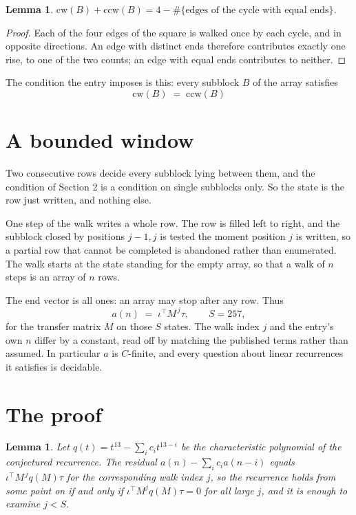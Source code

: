 \documentclass[11pt,a4paper]{article}
\theoremstyle{plain}
\newtheorem{lemma}[theorem]{Lemma}
\theoremstyle{definition}
\begin{document}
\begin{lemma}\label{lem:sum}
$\mathrm{cw}(B)+\mathrm{ccw}(B)=4-\#\{\text{edges of the cycle with equal ends}\}$.
\end{lemma}

\begin{proof}
Each of the four edges of the square is walked once by each cycle, and in opposite directions.
An edge with distinct ends therefore contributes exactly one rise, to one of the two counts;
an edge with equal ends contributes to neither.
\end{proof}

The condition the entry imposes is this: every subblock $B$ of the array satisfies
\[
\mathrm{cw}(B)\;=\;\mathrm{ccw}(B)
\]


\section{A bounded window}

Two consecutive rows decide every subblock lying between them, and the condition of Section 2 is a condition on single subblocks only. So the state is the row just written, and nothing else.

One step of the walk writes a whole row. The row is filled left to right, and the subblock
closed by positions $j-1,j$ is tested the moment position $j$ is written, so a partial row that
cannot be completed is abandoned rather than enumerated. The walk starts at the state standing
for the empty array, so that a walk of $n$ steps is an array of $n$ rows.

The end vector is all ones: an array may stop after any row. Thus
\[
a(n)\;=\;\iota^{\!\top}M^{\,j}\tau ,\qquad S=257,
\]
for the transfer matrix $M$ on those $S$ states. The walk index $j$ and the entry's own $n$
differ by a constant, read off by matching the published terms rather than assumed. In
particular $a$ is $C$-finite, and every question about linear recurrences it satisfies is
decidable.

\section{The proof}

\begin{lemma}\label{lem:crit}
Let $q(t)=t^{13}-\sum_i c_it^{13-i}$ be the characteristic polynomial of the
conjectured recurrence. The residual $a(n)-\sum_ic_ia(n-i)$ equals
$\iota^{\!\top}M^{\,j}q(M)\tau$ for the corresponding walk index $j$, so the recurrence
holds from some point on if and only if $\iota^{\!\top}M^{j}q(M)\tau=0$ for all large $j$,
and it is enough to examine $j<S$.
\end{lemma}
\end{document}
